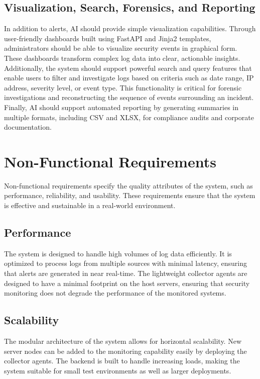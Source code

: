 \documentclass[12pt,a4paper]{report} %
\begin{document}
\subsection{Visualization, Search, Forensics, and Reporting}
In addition to alerts, AI should provide simple visualization capabilities. Through user-friendly dashboards built using FastAPI and Jinja2 templates, administrators should be able to visualize security events in graphical form. These dashboards transform complex log data into clear, actionable insights. Additionally, the system should support powerful search and query features that enable users to filter and investigate logs based on criteria such as date range, IP address, severity level, or event type. This functionality is critical for forensic investigations and reconstructing the sequence of events surrounding an incident. Finally, AI should support automated reporting by generating summaries in multiple formats, including CSV and XLSX, for compliance audits and corporate documentation.

\section{Non-Functional Requirements}

Non-functional requirements specify the quality attributes of the system, such as performance, reliability, and usability. These requirements ensure that the system is effective and sustainable in a real-world environment.

\subsection{Performance}
The system is designed to handle high volumes of log data efficiently. It is optimized to process logs from multiple sources with minimal latency, ensuring that alerts are generated in near real-time. The lightweight collector agents are designed to have a minimal footprint on the host servers, ensuring that security monitoring does not degrade the performance of the monitored systems.

\subsection{Scalability}
The modular architecture of the system allows for horizontal scalability. New server nodes can be added to the monitoring capability easily by deploying the collector agents. The backend is built to handle increasing loads, making the system suitable for small test environments as well as larger deployments.
\end{document}
